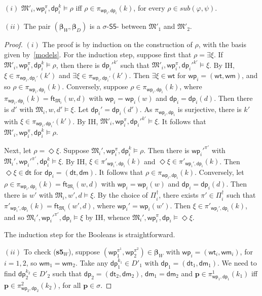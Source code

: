 \documentclass{lmcs} %
\theoremstyle{plain}\newtheorem{satz}[thm]{Satz} %
\newcommand{\sub}{\textit{sub}}
\newcommand{\BS}{$\mathsf{S5}$-\text{bisimulation}}
\newcommand{\wt}{\mathsf{wt}}
\newcommand{\dt}{\mathsf{dt}}
\newcommand{\ft}{\mathsf{ft}}
\newcommand{\wm}{\mathsf{wm}}
\newcommand{\dm}{\mathsf{dm}}
\newcommand{\iwp}{\mathsf{wp}_i}
\newcommand{\idp}{\mathsf{dp}_i}
\newcommand{\owp}{\mathsf{wp}_1}
\newcommand{\twp}{\mathsf{wp}_2}
\newcommand{\odp}{\mathsf{dp}_1}
\newcommand{\tdp}{\mathsf{dp}_2}
\newcommand{\bs}{\boldsymbol{\beta}}
\newcommand{\fform}[1]{\boldsymbol{#1}}
\newcommand{\pvar}{\fform{p}}
\begin{document}

\begin{lem}\label{types}
$(i)$ $\mathfrak M'_i, \iwp^\pi, \idp^k \models \rho$ iff $\rho \in \pi_{\iwp,\idp}(k)$, for every $\rho \in \sub(\varphi, \psi)$. 

$(ii)$ The pair $(\bs_{W},\bs_{D})$ is a $\sigma$-\BS{} between $\mathfrak M'_1$ and $\mathfrak M'_2$.
\end{lem}
%
\begin{proof}
	$(i)$ The proof is by induction on the construction of $\rho$, with the basis given by~\eqref{models}. For the induction step, suppose first that $\rho = \exists \xi$.
	If $\mathfrak M'_i,\iwp^\pi, \idp^k \models \rho$, then there is $\idp'^{k'}$ such that $\mathfrak M'_i, \iwp^\pi, \idp'^{k'} \models \xi$.
	By IH, $\xi\in \pi_{\iwp,\idp'}(k')$ and $\exists\xi \in \pi_{\iwp,\idp'}(k')$. 
	Then $\exists \xi \in \wt$ for $\iwp=(\wt,\wm)$, and so $\rho \in \pi_{\iwp,\idp}(k)$.
	Conversely, suppose $\rho \in \pi_{\iwp,\idp}(k)$, where $\pi_{\iwp,\idp}(k)= \ft_{\mathfrak{M}_{i}}(w,d)$ with $\iwp=\iwp(w)$ and $\idp=\idp(d)$. Then there is $d'$ with $\mathfrak{M}_{i}, w,d' \models \xi$. Let $\idp'=\idp(d')$. As $\pi_{\iwp,\idp}$ is surjective, there is $k'$ with $\xi\in \pi_{\iwp,\idp'}(k')$. By IH, $\mathfrak M'_i, \iwp^\pi, \idp'^{k'} \models \xi$. It follows that $\mathfrak M'_i, \iwp^\pi, \idp^k \models \rho$.
	
	Next, let $\rho = \Diamond \xi$. Suppose $\mathfrak{M}_{i}',\iwp^\pi, \idp^k \models \rho$. Then there is $\iwp'^{\pi'}$ with $\mathfrak{M}_{i}',\iwp'^{\pi'}, \idp^k \models \xi$. By IH, $\xi \in \pi'_{\iwp',\idp}(k)$ and $\Diamond \xi \in \pi'_{\iwp',\idp}(k)$. Then $\Diamond \xi  \in \dt$ for $\idp=(\dt,\dm)$. It follows that $\rho \in \pi_{\iwp,\idp}(k)$.
	Conversely, let $\rho \in \pi_{\iwp,\idp}(k) = \ft_{\mathfrak{M}_{i}}(w,d)$ with $\iwp=\iwp(w)$ and $\idp=\idp(d)$. Then there is $w'$ with $\mathfrak{M}_{i}, w', d \models \xi$. By the choice of $\Pi_{i}^{\dag}$, there exists $\pi' \in \Pi_{i}^{\dag}$ such that $\pi'_{\iwp',\idp}(k) = \ft_{\mathfrak{M}_{i}}(w',d)$, where $\iwp' = \iwp(w')$. Then $\xi \in \pi'_{\iwp',\idp}(k)$, and so $\mathfrak M_i', \iwp'^{\pi'}, \idp \models \xi$  by IH, whence $\mathfrak M_i', \iwp^{\pi},\idp \models \Diamond \xi$.
	
	The induction step for the Booleans is straightforward.

$(ii)$ To check (\textbf{s5}$_W$), suppose $(\owp^{\pi^1}, \twp^{\pi^2})\in\bs_W$ with $\iwp = (\wt_i, \wm_i)$, for $i = 1,2$, so $\wm_1 = \wm_2$. Take any $\odp^{k_1} \in D'_1$ with $\odp = (\dt_1, \dm_1)$. We need to find $\tdp^{k_2} \in D'_2$ such that $\tdp = (\dt_2, \dm_2)$, $\dm_1 = \dm_2$ and $\pvar \in \pi^1_{\owp,\odp}(k_1)$ iff $\pvar \in \pi^2_{\twp,\tdp}(k_2)$, for all $\pvar \in \sigma$.
	

\end{proof}
\end{document}

